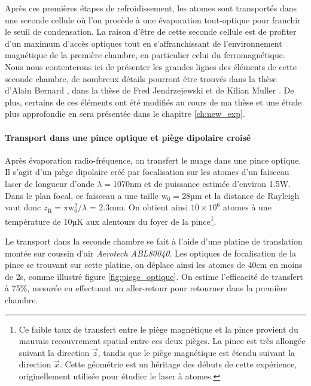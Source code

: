 Après ces premières étapes de refroidissement, les atomes sont transportés dans une seconde cellule où l'on procède à une évaporation tout-optique pour franchir le seuil de condensation. La raison d'être de cette seconde cellule est de profiter d'un maximum d'accès optiques tout en s'affranchissant de l'environnement magnétique de la première chambre, en particulier celui du ferromagnétique.
Nous nous contenterons ici de présenter les grandes lignes des éléments de cette seconde chambre, de nombreux détails pourront être trouvés dans la thèse d'Alain Bernard \citep{bernard2010transport}, dans la thèse de Fred Jendrzejewski \citep{jendrzejewski2012quantum} et de Kilian Muller \citep{muller2015coherent}. De plus, certains de ces éléments ont été modifiés au cours de ma thèse et une étude plus approfondie en sera présentée dans le chapitre \ref{ch:new_exp}.

\paragraph*{Transport dans une pince optique et piège dipolaire croisé}
Après évaporation radio-fréquence, on transfert le nuage dans une pince optique. Il s'agit d'un piège dipolaire créé par focalisation sur les atomes d'un faisceau laser de longueur d'onde $\lambda=$1070nm et de puissance estimée d'environ 1.5W. Dans le plan focal, ce faisceau a une taille $\mathrm{w}_{\mathrm{0}}=$28µm et la distance de Rayleigh vaut donc $z_{\mathrm{R}}= \pi \mathrm{w}_{\mathrm{0}}^2 / \lambda$ = 2.3mm. On obtient ainsi $10 \times 10^6$ atomes à une température de 10µK aux alentours du foyer de la pince\footnote{Ce faible taux de transfert entre le piège magnétique et la pince provient du mauvais recouvrement spatial entre ces deux pièges. La pince est très allongée suivant la direction $\vec{z}$, tandis que le piège magnétique est étendu suivant la direction $\vec{x}$. Cette géométrie est un héritage des débuts de cette expérience, originellement utilisée pour étudier le laser à atomes.}.

Le transport dans la seconde chambre se fait à l'aide d'une platine de translation montée sur coussin d'air \emph{Aerotech ABL80040}. Les optiques de focalisation de la pince se trouvant sur cette platine, on déplace ainsi les atomes de 40cm en moins de 2s, comme illustré figure \ref{fig:piege_optique}. On estime l'efficacité de transfert à 75\%, mesurée en effectuant un aller-retour pour retourner dans la première chambre.

